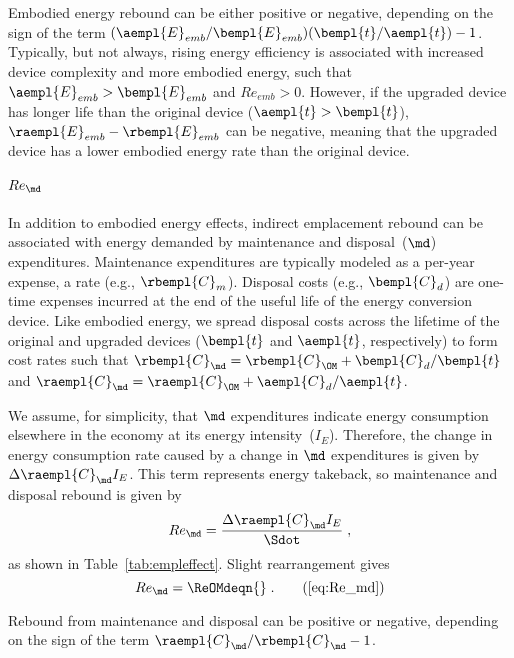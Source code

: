 Embodied energy rebound can be either positive or negative, depending on 
the sign of the term
$(\aempl{E}_{emb}/\bempl{E}_{emb})(\bempl{t}/\aempl{t}) - 1$.
Typically, but not always,
rising energy efficiency is associated with increased device complexity
and more embodied energy,
such that $\aempl{E}_{emb} > \bempl{E}_{emb}$ and $Re_{emb} > 0$.
However, if the upgraded device has longer life than the original device
($\aempl{t} > \bempl{t}$),
$\raempl{E}_{emb} - \rbempl{E}_{emb}$ can be negative,
meaning that the upgraded device has a lower embodied energy rate than the original device.


\paragraph{$Re_{\md}$} 
\label{sec:Re_OMd}

In addition to embodied energy effects, 
indirect emplacement rebound 
can be associated with energy demanded by maintenance and disposal~($\md$) expenditures.
Maintenance expenditures are typically modeled as a per-year expense, 
a rate (e.g., $\rbempl{C}_m$).
Disposal costs (e.g., $\bempl{C}_d$) are one-time expenses incurred at the end of the useful life of the energy conversion device.
Like embodied energy, we spread disposal costs across the lifetime 
of the original and upgraded devices ($\bempl{t}$ and $\aempl{t}$, respectively)
to form cost rates such that $\rbempl{C}_{\md} = \rbempl{C}_{\OM} + \bempl{C}_d/\bempl{t}$
and
$\raempl{C}_{\md} = \raempl{C}_{\OM} + \aempl{C}_d/\aempl{t}$.

We assume, for simplicity, that $\md$ expenditures indicate energy consumption
elsewhere in the economy at its energy intensity~($I_E$).
Therefore, the change in energy consumption rate caused by a change in $\md$ expenditures
is given by $\Delta \raempl{C}_{\md} I_E$.
This term represents energy takeback, so maintenance and disposal rebound is given by
%
\begin{equation} \label{eq:Re_md_def}
  Re_{\md} = \frac{\Delta \raempl{C}_{\md} I_E}{\Sdot} \; ,
\end{equation}
%
as shown in Table~\ref{tab:empleffect}.
Slight rearrangement gives
%
\begin{equation}
  Re_{\md} = \ReOMdeqn{} \; . \tag{\ref{eq:Re_md}}
\end{equation}

Rebound from maintenance and disposal can be positive or negative,
depending on the sign of the term $\raempl{C}_{\md}/\rbempl{C}_{\md} - 1$.


